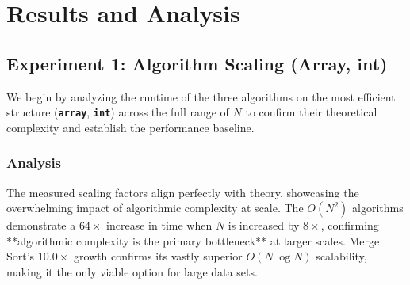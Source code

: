 \documentclass[11pt, a4paper]{article}
\begin{document}
\section{Results and Analysis}

\subsection{Experiment 1: Algorithm Scaling (Array, int)}
We begin by analyzing the runtime of the three algorithms on the most efficient structure (\textbf{\texttt{array}}, \textbf{\texttt{int}}) across the full range of $N$ to confirm their theoretical complexity and establish the performance baseline.

\subsubsection{Analysis}
The measured scaling factors align perfectly with theory, showcasing the overwhelming impact of algorithmic complexity at scale. The $O(N^2)$ algorithms demonstrate a $64\times$ increase in time when $N$ is increased by $8\times$, confirming **algorithmic complexity is the primary bottleneck** at larger scales. Merge Sort's $10.0\times$ growth confirms its vastly superior $O(N \log N)$ scalability, making it the only viable option for large data sets.
\end{document}
